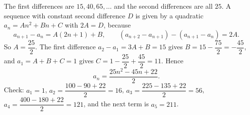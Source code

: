 The first differences are $15,40,65,\dots$ and the second differences are all $25$. A sequence with constant second difference $D$ is given by a quadratic $a_n=An^2+Bn+C$ with $2A=D$, because
\[
a_{n+1}-a_n=A(2n+1)+B,\qquad (a_{n+2}-a_{n+1})-(a_{n+1}-a_n)=2A .
\]
So $A=\dfrac{25}{2}$. The first difference $a_2-a_1=3A+B=15$ gives $B=15-\dfrac{75}{2}=-\dfrac{45}{2}$, and $a_1=A+B+C=1$ gives $C=1-\dfrac{25}{2}+\dfrac{45}{2}=11$. Hence
\[
a_n=\boxed{\dfrac{25n^2-45n+22}{2}}.
\]
Check: $a_1=1$, $a_2=\dfrac{100-90+22}{2}=16$, $a_3=\dfrac{225-135+22}{2}=56$, $a_4=\dfrac{400-180+22}{2}=121$, and the next term is $a_5=211$.
